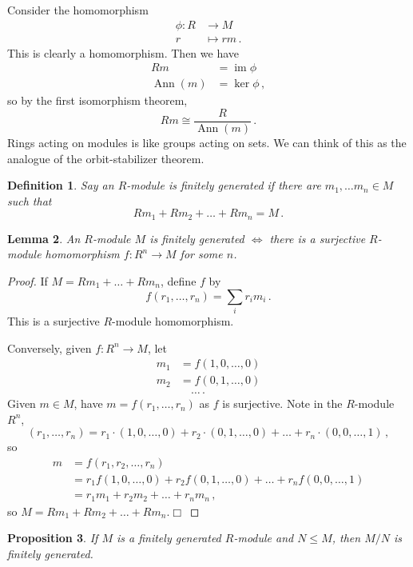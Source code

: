 \documentclass{article}
\theoremstyle{plain}\theoremheaderfont{\normalfont\itshape}\theorembodyfont{\rmfamily}\theoremseparator{.}\newtheorem*{rem}{Remark}\newtheorem*{ex}{Example}\newtheorem*{proof}{Proof}\newtheorem*{altp}{Alternative proof}\newtheorem*{nonex}{Non-Example}
\theoremstyle{plain}\theoremheaderfont{\normalfont\bfseries}\theorembodyfont{\rmfamily}\theoremseparator{.}\newtheorem{thm}{Theorem}[section]\newtheorem{lem}[thm]{Lemma}\newtheorem{prop}[thm]{Proposition}\newtheorem*{cor}{Corollary}\newtheorem{defn}[thm]{Definition}\newtheorem{clm}[thm]{Claim}\newtheorem{clminproof}{Claim}\newtheorem*{notn}{Notation}\newtheorem*{exer}{Exercise}\newtheorem*{lemnn}{Lemma}
\theoremstyle{break}\theoremheaderfont{\normalfont\itshape}\theorembodyfont{\rmfamily}\theoremseparator{.\medskip}\newtheorem*{proofskip}{Proof}\newtheorem*{exs}{Examples}\newtheorem*{rems}{Remarks}\newtheorem*{obs}{Observations}
\theoremstyle{break}\theoremheaderfont{\normalfont\bfseries}\theorembodyfont{\rmfamily}\theoremseparator{.\medskip}\newtheorem{lemskip}[thm]{Lemma}\newtheorem{defnskip}[thm]{Definition}\newtheorem{propskip}[thm]{Proposition}\newtheorem{thmskip}[thm]{Theorem}
\numberwithin{equation}{section}
\newcommand{\qed}{\hfill\ensuremath{\Box}}
\DeclareMathOperator*{\im}{im}
\DeclareMathOperator{\Ann}{Ann}
\begin{document}
    Consider the homomorphism
    \begin{align*}
        \phi:R&\longrightarrow M\\
        r&\longmapsto rm\,.
    \end{align*}
    This is clearly a homomorphism. Then we have
    \begin{align*}
        Rm&=\im\phi\\
        \Ann(m)&=\ker\phi\,,
    \end{align*}
    so by the first isomorphism theorem,
    \[Rm\cong\frac{R}{\Ann(m)}\,.\]
    Rings acting on modules is like groups acting on sets. We can think of this as the analogue of the orbit-stabilizer theorem.
    \begin{defn}
        Say an \(R\)-module is \textit{finitely generated} if there are \(m_1,\dots m_n\in M\) such that
        \[Rm_1+Rm_2+\dots+Rm_n=M\,.\]
    \end{defn}
    \begin{lem}
        An \(R\)-module \(M\) is finitely generated \(\iff\) there is a surjective \(R\)-module homomorphism \(f:R^n\to M\) for some \(n\).
    \end{lem}
    \begin{proof}
        If \(M=Rm_1+\dots+Rm_n\), define \(f\) by
        \[f(r_1,\dots,r_n)=\sum_i r_im_i\,.\]
        This is a surjective \(R\)-module homomorphism.

        Conversely, given \(f:R^n\to M\), let
        \begin{align*}
            m_1&=f(1,0,\dots,0)\\
            m_2&=f(0,1,\dots,0)\\
            &\quad\dots\,.
        \end{align*}
        Given \(m\in M\), have \(m=f(r_1,\dots,r_n)\) as \(f\) is surjective. Note in the \(R\)-module \(R^n\),
        \[(r_1,\dots,r_n)=r_1\cdot(1,0,\dots,0)+r_2\cdot(0,1,\dots,0)+\dots +r_n\cdot (0,0,\dots,1)\,,\]
        so
        \begin{align*}
            m&=f(r_1,r_2,\dots,r_n)\\
            &=r_1f(1,0,\dots,0)+r_2f(0,1,\dots,0)+\dots+r_nf(0,0,\dots,1)\\
            &=r_1m_1+r_2m_2+\dots+r_nm_n\,,
        \end{align*}
        so \(M=Rm_1+Rm_2+\dots+Rm_n\).\qed        
    \end{proof}
    \begin{prop}
        If \(M\) is a finitely generated \(R\)-module and \(N\le M\), then \(M/N\) is finitely generated.
    \end{prop}
\end{document}
